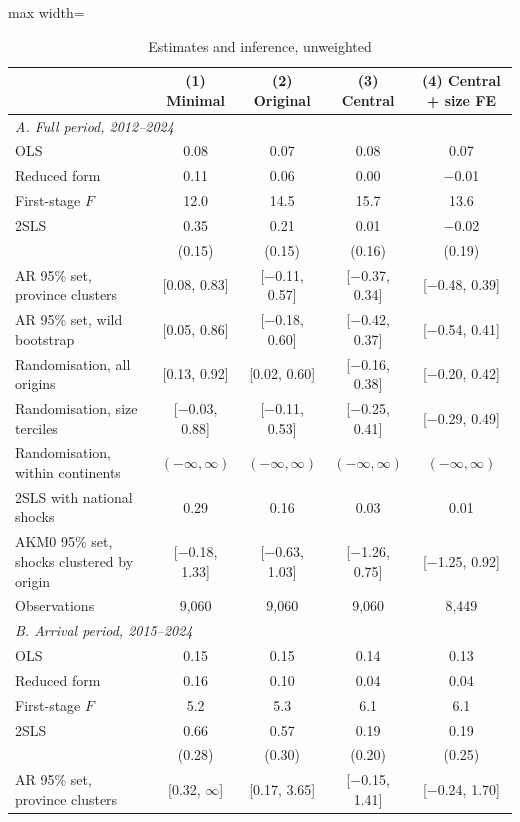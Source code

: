 \begin{table}[!htbp]\centering\small
\caption{Estimates and inference, unweighted}\label{tab:main_unw}
\begin{adjustbox}{max width=\linewidth}\begin{tabular}{lcccc}\toprule
 & (1) Minimal & (2) Original & (3) Central & (4) Central + size FE \\ \midrule
\multicolumn{5}{l}{\textit{A. Full period, 2012--2024}}\\
OLS & 0.08 & 0.07 & 0.08 & 0.07 \\
Reduced form & 0.11 & 0.06 & 0.00 & $-$0.01 \\
First-stage $F$ & 12.0 & 14.5 & 15.7 & 13.6 \\
2SLS & 0.35 & 0.21 & 0.01 & $-$0.02 \\
 & (0.15) & (0.15) & (0.16) & (0.19) \\
AR 95\% set, province clusters & [0.08, 0.83] & [$-$0.11, 0.57] & [$-$0.37, 0.34] & [$-$0.48, 0.39] \\
AR 95\% set, wild bootstrap & [0.05, 0.86] & [$-$0.18, 0.60] & [$-$0.42, 0.37] & [$-$0.54, 0.41] \\
Randomisation, all origins & [0.13, 0.92] & [0.02, 0.60] & [$-$0.16, 0.38] & [$-$0.20, 0.42] \\
Randomisation, size terciles & [$-$0.03, 0.88] & [$-$0.11, 0.53] & [$-$0.25, 0.41] & [$-$0.29, 0.49] \\
Randomisation, within continents & $(-\infty,\infty)$ & $(-\infty,\infty)$ & $(-\infty,\infty)$ & $(-\infty,\infty)$ \\
2SLS with national shocks & 0.29 & 0.16 & 0.03 & 0.01 \\
AKM0 95\% set, shocks clustered by origin & [$-$0.18, 1.33] & [$-$0.63, 1.03] & [$-$1.26, 0.75] & [$-$1.25, 0.92] \\
Observations & 9,060 & 9,060 & 9,060 & 8,449 \\
\midrule
\multicolumn{5}{l}{\textit{B. Arrival period, 2015--2024}}\\
OLS & 0.15 & 0.15 & 0.14 & 0.13 \\
Reduced form & 0.16 & 0.10 & 0.04 & 0.04 \\
First-stage $F$ & 5.2 & 5.3 & 6.1 & 6.1 \\
2SLS & 0.66 & 0.57 & 0.19 & 0.19 \\
 & (0.28) & (0.30) & (0.20) & (0.25) \\
AR 95\% set, province clusters & [0.32, $\infty$] & [0.17, 3.65] & [$-$0.15, 1.41] & [$-$0.24, 1.70] \\

\end{tabular}
\end{adjustbox}
\end{table}
